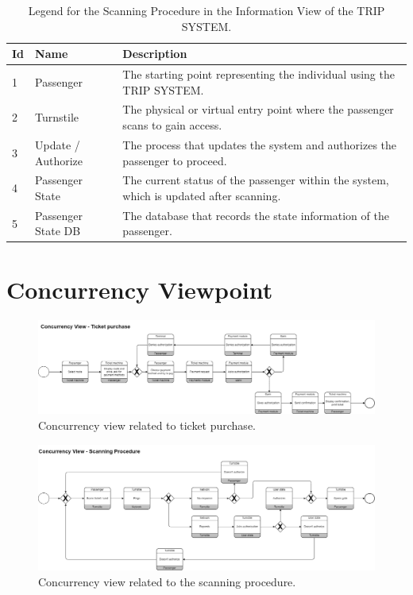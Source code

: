 \begin{table}[H]
    \centering
    \caption{Legend for the Scanning Procedure in the Information View of the TRIP SYSTEM.}
    \label{tab:scanning_procedure_legend}
    \begin{tabular}{@{}llp{10cm}@{}}
    \toprule
    \textbf{Id} & \textbf{Name} & \textbf{Description} \\
    \midrule
    1 & Passenger & The starting point representing the individual using the TRIP SYSTEM. \\
    2 & Turnstile & The physical or virtual entry point where the passenger scans to gain access. \\
    3 & Update / Authorize & The process that updates the system and authorizes the passenger to proceed. \\
    4 & Passenger State & The current status of the passenger within the system, which is updated after scanning. \\
    5 & Passenger State DB & The database that records the state information of the passenger. \\
    \bottomrule
\end{tabular}
\end{table}

\section{Concurrency Viewpoint}

\begin{figure}[H]
    \centering
    \includegraphics[width=\textwidth]{drawings/views_final_version/concurrency_view_1.png}
    \caption{Concurrency view related to ticket purchase.}
    \label{fig:concurrency_view_1}
\end{figure}

\begin{figure}[H]
    \centering
    \includegraphics[width=\textwidth]{drawings/views_final_version/concurrency_view_2.png}
    \caption{Concurrency view related to the scanning procedure.}
    \label{fig:concurrency_view_2}
\end{figure}


